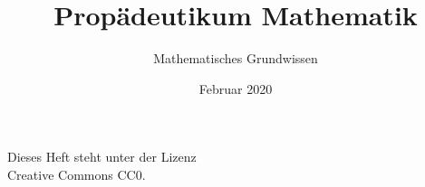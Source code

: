 \documentclass[a4paper,11pt,fleqn,twocolumn,twoside,dvipdfmx]{scrbook}
\title{Propädeutikum Mathematik}
\subtitle{Mathematisches Grundwissen}
\author{}
\date{Februar 2020}
\begin{document}
\maketitle
\clearpage

\noindent
Dieses Heft steht unter der Lizenz\\
Creative Commons CC0.

\tableofcontents



\end{document}
